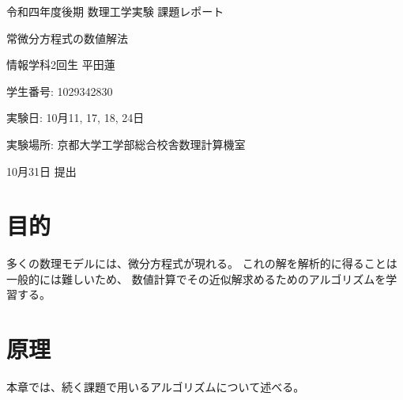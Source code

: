 \documentclass[a4j, titlepage]{jsarticle}
\numberwithin{equation}{section}
\begin{document}
\begin{titlepage}
    \begin{center}
        {\Large 令和四年度後期 数理工学実験 課題レポート}

        \vspace*{180truept}

        {\Huge 常微分方程式の数値解法}

        \vspace{160truept}

        {\Large 情報学科2回生 平田蓮}

        \vspace{10truept}

        {\large 学生番号: 1029342830}

        \vspace{60truept}

        {\large 実験日: 10月11, 17, 18, 24日}

        \vspace{10truept}

        {\large 実験場所: 京都大学工学部総合校舎数理計算機室}

        \vspace{60truept}

        {\large 10月31日 提出}
    \end{center}
\end{titlepage}

\tableofcontents
\clearpage

\section{目的}
    多くの数理モデルには、微分方程式が現れる。
    これの解を解析的に得ることは一般的には難しいため、
    数値計算でその近似解求めるためのアルゴリズムを学習する。

\section{原理}
    本章では、続く課題で用いるアルゴリズムについて述べる。
\end{document}
